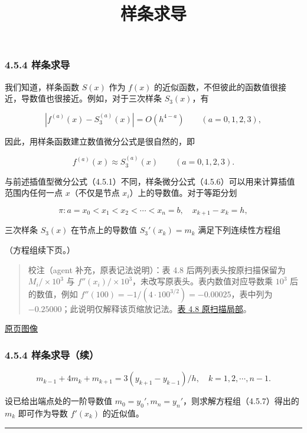 \documentclass[
  10pt,
  fontset=fandol]{ctexart}
\title{样条求导}
\author{}
\date{}
\begin{document}
\maketitle

\subsubsection{4.5.4 样条求导}\label{ux6837ux6761ux6c42ux5bfc}

我们知道，样条函数 \(S(x)\) 作为 \(f(x)\) 的近似函数，不但彼此的函数值很接近，导数值也很接近。例如，对于三次样条 \(S_3(x)\)，有

\[
|f^{(a)}(x)-S_3^{(a)}(x)|=O(h^{4-a})\qquad(a=0,1,2,3),
\]

因此，用样条函数建立数值微分公式是很自然的，即

\[
f^{(a)}(x)\approx S_3^{(a)}(x)\qquad(a=0,1,2,3).
\tag{4.5.6}
\]

与前述插值型微分公式（4.5.1）不同，样条微分公式（4.5.6）可以用来计算插值范围内任何一点 \(x\)（不仅是节点 \(x_i\)）上的导数值。对于等距分划

\[
\pi:a=x_0<x_1<x_2<\cdots<x_n=b,\quad x_{k+1}-x_k=h,
\]

三次样条 \(S_3(x)\) 在节点上的导数值 \(S_3'(x_k)=m_k\) 满足下列连续性方程组

（方程组续下页。）

\begin{quote}
校注（agent 补充，原表记法说明）：表 4.8 后两列表头按原扫描保留为 \(M_i/\times10^3\) 与 \(f''(x_i)/\times10^3\)，未改写原表头。表内数值对应导数乘 \(10^3\) 后的数值，例如 \(f''(100)=-1/(4\cdot100^{3/2})=-0.00025\)，表中列为 \(-0.25000\)；此说明仅解释该页缩放记法。\href{../assets/ch04b/review-table-4-8.png}{表 4.8 原扫描局部}。
\end{quote}

\href{../../source-images/pdf-117.jpeg}{原页图像}

\subsubsection{4.5.4 样条求导（续）}\label{ux6837ux6761ux6c42ux5bfcux7eed}

\[
m_{k-1}+4m_k+m_{k+1}=3(y_{k+1}-y_{k-1})/h,\quad k=1,2,\cdots,n-1.
\tag{4.5.7}
\]

设已给出端点处的一阶导数值 \(m_0=y_0',m_n=y_n'\)，则求解方程组（4.5.7）得出的 \(m_k\) 即可作为导数 \(f'(x_k)\) 的近似值。

\begin{center}\rule{0.5\linewidth}{0.5pt}\end{center}
\end{document}
